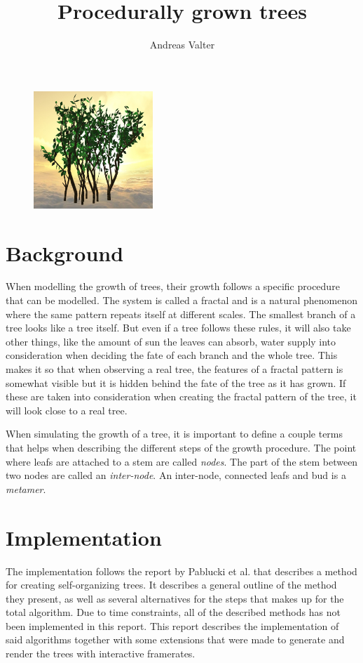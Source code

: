 \documentclass[11pt]{article} %
\title{Procedurally grown trees}
\author{Andreas Valter}
\begin{document}
\maketitle
\begin{figure}[htp]
	\centering
	\includegraphics[width=0.4\textwidth]{manytree.png}
	\label{fig:asd}
\end{figure}

\section{Background}
When modelling the growth of trees, their growth follows a specific procedure that can be modelled.
The system is called a fractal and is a natural phenomenon where the same pattern repeats itself at different scales.
The smallest branch of a tree looks like a tree itself.
But even if a tree follows these rules, it will also take other things, like the amount of sun the leaves can absorb, water supply into consideration when deciding the fate of each branch and the whole tree.
This makes it so that when observing a real tree, the features of a fractal pattern is somewhat visible but it is hidden behind the fate of the tree as it has grown.
If these are taken into consideration when creating the fractal pattern of the tree, it will look close to a real tree.

When simulating the growth of a tree, it is important to define a couple terms that helps when describing the different steps of the growth procedure.
The point where leafs are attached to a stem are called \emph{nodes}.
The part of the stem between two nodes are called an \emph{inter-node}.
An inter-node, connected leafs and bud is a \emph{metamer}.
\cite{Palubicki:2009:STM:1531326.1531364}

\section{Implementation}
The implementation follows the report by Pablucki et al. \cite{Palubicki:2009:STM:1531326.1531364} that describes a method for creating self-organizing trees.
It describes a general outline of the method they present, as well as several alternatives for the steps that makes up for the total algorithm.
Due to time constraints, all of the described methods has not been implemented in this report.
This report describes the implementation of said algorithms together with some extensions that were made to generate and render the trees with interactive framerates.
\end{document}
